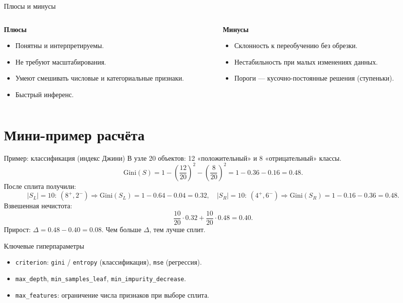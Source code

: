 \documentclass[12pt]{beamer}
\begin{document}
\begin{frame}{Плюсы и минусы}
	\begin{columns}[T]
		\begin{column}{0.48\textwidth}
			\textbf{Плюсы}
			\begin{itemize}
				\item Понятны и интерпретируемы.
				\item Не требуют масштабирования.
				\item Умеют смешивать числовые и категориальные признаки.
				\item Быстрый инференс.
			\end{itemize}
		\end{column}
		\begin{column}{0.48\textwidth}
			\textbf{Минусы}
			\begin{itemize}
				\item Склонность к переобучению без обрезки.
				\item Нестабильность при малых изменениях данных.
				\item Пороги — кусочно-постоянные решения (ступеньки).
			\end{itemize}
		\end{column}
	\end{columns}
\end{frame}

\section{Мини-пример расчёта}

\begin{frame}{Пример: классификация (индекс Джини)}
	В узле 20 объектов: 12 «положительный» и 8 «отрицательный» классы. \\
	\[
		\mathrm{Gini}(S) = 1 - \left(\frac{12}{20}\right)^2 - \left(\frac{8}{20}\right)^2
		= 1 - 0.36 - 0.16 = 0.48.
	\]
	После сплита получили:
	\[
		|S_L|=10:~(8^+,2^-) \Rightarrow \mathrm{Gini}(S_L)=1-0.64-0.04=0.32, \quad
		|S_R|=10:~(4^+,6^-) \Rightarrow \mathrm{Gini}(S_R)=1-0.16-0.36=0.48.
	\]
	Взвешенная нечистота:
	\[
		\frac{10}{20}\cdot 0.32 + \frac{10}{20}\cdot 0.48 = 0.40.
	\]
	Прирост: $\Delta = 0.48 - 0.40 = 0.08$. Чем больше $\Delta$, тем лучше сплит.
\end{frame}

\begin{frame}{Ключевые гиперпараметры}
	\begin{itemize}
		\item \texttt{criterion}: \texttt{gini} / \texttt{entropy} (классификация), \texttt{mse} (регрессия).
		\item \texttt{max\_depth}, \texttt{min\_samples\_leaf}, \texttt{min\_impurity\_decrease}.
		\item \texttt{max\_features}: ограничение числа признаков при выборе сплита.
	\end{itemize}
\end{frame}
\end{document}
